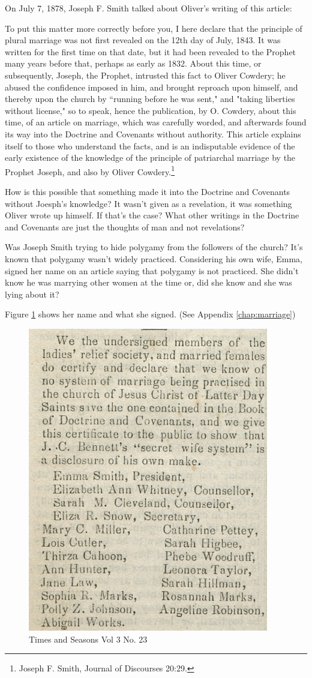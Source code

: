 On July 7, 1878, Joseph F. Smith talked about Oliver's writing of this article:

\begin{displayquote}
To put this matter more correctly before you, I here declare that the principle of 
plural marriage was not first revealed on the 12th day of July, 1843. It was 
written for the first time on that date, but it had been revealed to the Prophet 
many years before that, perhaps as early as 1832. About this time, or 
subsequently, Joseph, the Prophet, intrusted this fact to Oliver Cowdery; he 
abused the confidence imposed in him, and brought reproach upon himself, and 
thereby upon the church by ``running before he was sent," and "taking liberties 
without license," so to speak, hence the publication, by O. Cowdery, about this 
time, of an article on marriage, which was carefully worded, and afterwards found 
its way into the Doctrine and Covenants without authority. This article explains 
itself to those who understand the facts, and is an indisputable evidence of the 
early existence of the knowledge of the principle of patriarchal marriage by the 
Prophet Joseph, and also by Oliver Cowdery.\footnote{Joseph F. Smith, Journal of 
Discourses 20:29.}
\end{displayquote}

How is this possible that something made it into the Doctrine and Covenants without
Joesph's knowledge? It wasn't given as a revelation, it was something Oliver wrote up
himself. If that's the case? What other writings in the Doctrine and Covenants are
just the thoughts of man and not revelations?

Was Joseph Smith trying to hide polygamy from the followers of the church? It's known
that polygamy wasn't widely practiced. Considering his own wife, Emma, signed her
name on an article saying that polygamy is not practiced. She didn't know he was
marrying other women at the time or, did she know and she was lying about it?

Figure \ref{fig:tas1} shows her name and what she signed. (See Appendix
\ref{chap:marriage})

\begin{figure}[h!]
  \centering
  \includegraphics[width=0.4\linewidth]{articles/images/polygamy.png}
  \caption{Times and Seasons Vol 3 No. 23}
  \label{fig:tas1}
\end{figure}

